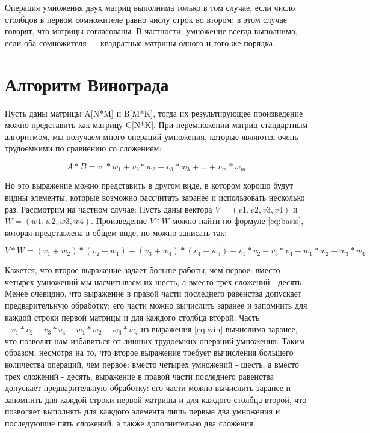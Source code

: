 Операция умножения двух матриц выполнима только в том случае, если число столбцов в первом сомножителе равно числу строк во втором; в этом случае говорят, что матрицы согласованы. В частности, умножение всегда выполнимо, если оба сомножителя — квадратные матрицы одного и того же порядка.

\section{ Алгоритм Винограда}

Пусть даны матрицы A[N*M] и B[M*K], тогда их результирующее произведение можно представить как матрицу C[N*K]. При перемножении матриц стандартным алгоритмом, мы получаем много операций умножения, которые являются очень трудоемкими по сравнению со сложением:

\begin{equation}
    A * B = v_1*w_1 + v_2 * w_2 + v_3 * w_3 + ... + v_m * w_m
    \label{eq:basis}
\end{equation}

Но это выражение можно представить в другом виде, в котором хорошо будут видны элементы, которые возможно рассчитать заранее и использовать несколько раз. Рассмотрим на частном случае:
Пусть даны вектора $V = (v1, v2, v3, v4)$ и $W = (w1, w2, w3, w4)$. Произведение $V*W$ можно найти по формуле \ref{eq:basis}, которая представлена в общем виде, но можно записать так:

\begin{equation}
    V*W = (v_1 + w_2)*(v_2 + w_1) + (v_3 + w_4)*(v_4+w_3) - v_1 * v_2 - v_3 * v_4 - w_1 * w_2 - w_3 * w_4
    \label{eq:win}
\end{equation}

Кажется, что второе выражение задает больше работы, чем первое: вместо четырех умножений мы насчитываем их шесть, а вместо трех сложений - десять. Менее очевидно, что выражение в правой части последнего равенства допускает предварительную обработку: его части можно вычислить заранее и запомнить для каждой строки первой матрицы и для каждого столбца второй. 
Часть $- v_1 * v_2 - v_3 * v_4 - w_1 * w_2 - w_3 * w_4$ из выражения \ref{eq:win} вычислима заранее, что позволят нам избавиться от лишних трудоемких операций умножения.
 Таким образом, несмотря на то, что второе выражение требует вычисления большего количества операций, чем первое: вместо четырех умножений - шесть, а вместо трех сложений - десять, выражение в правой части последнего равенства допускает предварительную обработку: его части можно вычислить заранее и запомнить для каждой строки первой матрицы и для каждого столбца второй, что позволяет выполнять для каждого элемента лишь первые два умножения и последующие пять сложений, а также дополнительно два сложения.


